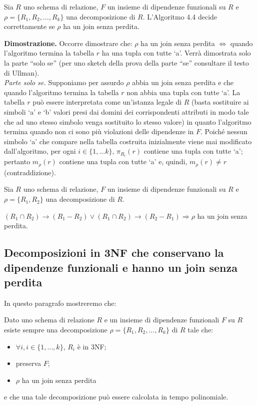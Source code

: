 \begin{theo}
Sia $R$ uno schema di relazione, $F$ un insieme di dipendenze funzionali su $R$ e $\rho =\{R_1, R_2, \ldots, R_k\}$
una decomposizione di $R$. L'Algoritmo 4.4 decide correttamente se $\rho$ ha un join senza perdita.
\end{theo}
\textbf{Dimostrazione.} Occorre dimostrare che: $\rho$ ha un join senza perdita  
$\Leftrightarrow$ quando l'algoritmo termina la tabella $r$ ha una tupla con tutte `a'. Verrà dimostrata solo la 
parte ``solo se'' (per uno sketch della 
prova della parte ``se'' consultare il testo di Ullman).\\
\emph{Parte solo se.} Supponiamo per assurdo $\rho$ abbia un join senza perdita e che quando l'algoritmo
termina la tabella $r$ non abbia una tupla con tutte `a'. La tabella $r$ può essere interpretata come
un'istanza legale di $R$ (basta sostituire ai simboli `a' e `b' valori presi dai domini dei corrispondenti
attributi in modo tale che ad uno stesso simbolo venga sostituito lo stesso valore) in quanto
l'algoritmo termina quando non ci sono più violazioni delle dipendenze in $F$. Poiché nessun
simbolo `a' che compare nella tabella costruita inizialmente viene mai modificato dall'algoritmo,
per ogni $i \in \{1, \ldots k\}$, $\pi_{R_i}(r)$ contiene una tupla con tutte `a'; pertanto $m_\rho(r)$ contiene una 
tupla con tutte `a' e, quindi, $m_\rho(r) \not= r$ (contraddizione).
\begin{cor}
Sia $R$ uno schema di relazione, $F$ un insieme di dipendenze funzionali su $R$ e $\rho = \{R_1, R_2\}$
una decomposizione di $R$.
\begin{center}
$(R_1 \cap R_2) \rightarrow (R_1 - R_2) \vee (R_1 \cap R_2) \rightarrow (R_2 -R_1) \Rightarrow \rho$ ha un join senza 
perdita.                            
\end{center}
\end{cor}

\subsection{Decomposizioni in 3NF che conservano la dipendenze funzionali e hanno un join senza perdita}

In questo paragrafo mostreremo che: 
\begin{prop}
Dato uno schema di relazione $R$ e un insieme di dipendenze funzionali $F$ su $R$ esiste sempre una decomposizione
$\rho = \{R_1, R_2, \ldots, R_k\}$ di $R$ tale che:
\begin{itemize}
 \item $\forall i, i \in \{1, \ldots, k\}$, $R_i$ è in 3NF;
 \item preserva $F$;
 \item $\rho$ ha un join senza perdita
\end{itemize}
e che una tale decomposizione può essere calcolata in tempo polinomiale. 
\end{prop}

